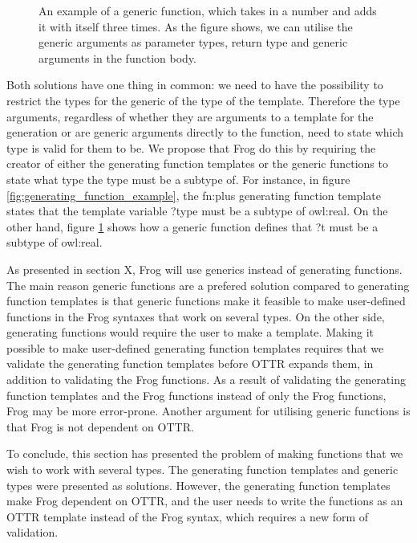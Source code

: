 \begin{figure}
    \centering
    
    \caption{An example of a generic function, which takes in a number and adds it with itself three times. As the figure shows, we can utilise the generic arguments as parameter types, return type and generic arguments in the function body. }
    \label{fig:generic_function}
\end{figure}

\para 
Both solutions have one thing in common: we need to have the possibility to restrict the types for the generic of the type of the template. Therefore the type arguments, regardless of whether they are arguments to a template for the generation or are generic arguments directly to the function, need to state which type is valid for them to be. We propose that Frog do this by requiring the creator of either the generating function templates or the generic functions to state what type the type must be a subtype of. For instance, in figure \ref{fig:generating_function_example}, the fn:plus generating function template states that the template variable ?type must be a subtype of owl:real. On the other hand, figure \ref{fig:generic_function} shows how a generic function defines that ?t must be a subtype of owl:real. 

\para 
As presented in section X, Frog will use generics instead of generating functions. The main reason generic functions are a prefered solution compared to generating function templates is that generic functions make it feasible to make user-defined functions in the Frog syntaxes that work on several types. On the other side, generating functions would require the user to make a template. Making it possible to make user-defined generating function templates requires that we validate the generating function templates before OTTR expands them, in addition to validating the Frog functions. As a result of validating the generating function templates and the Frog functions instead of only the Frog functions, Frog may be more error-prone. Another argument for utilising generic functions is that Frog is not dependent on OTTR. 

\para
To conclude, this section has presented the problem of making functions that we wish to work with several types. The generating function templates and generic types were presented as solutions. However, the generating function templates make Frog dependent on  OTTR, and the user needs to write the functions as an OTTR template instead of the Frog syntax, which requires a new form of validation. 

